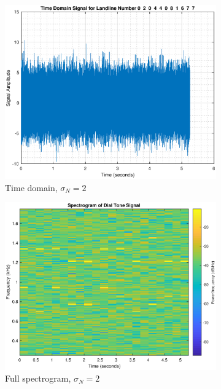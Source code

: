 \documentclass{article}
\begin{document}
\begin{figure}[h!]
\centering
\begin{subfigure}{0.32\textwidth}
\centering
\includegraphics[width = \textwidth]{dtp_fullsig_n2}
\caption{Time domain, $\sigma_N=2$}
\label{fig:dtp_fullsig_n2}
\end{subfigure}
\begin{subfigure}{0.32\textwidth}
\centering
\includegraphics[width = \textwidth]{dtp_spec_n2}
\caption{Full spectrogram, $\sigma_N=2$}
\label{fig:dtp_spec_n2}
\end{subfigure}
\begin{subfigure}{0.32\textwidth}

\end{subfigure}
\end{figure}
\end{document}
